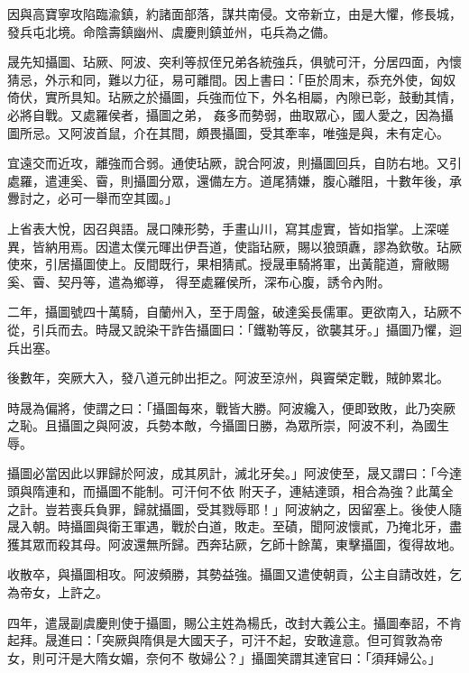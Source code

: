 \begin{pinyinscope}
 因與高寶寧攻陷臨渝鎮，約諸面部落，謀共南侵。文帝新立，由是大懼，修長城，發兵屯北境。命陰壽鎮幽州、虞慶則鎮並州，屯兵為之備。



 晟先知攝圖、玷厥、阿波、突利等叔侄兄弟各統強兵，俱號可汗，分居四面，內懷猜忌，外示和同，難以力征，易可離間。因上書曰：「臣於周末，忝充外使，匈奴倚伏，實所具知。玷厥之於攝圖，兵強而位下，外名相屬，內隙已彰，鼓動其情，必將自戰。又處羅侯者，攝圖之弟，
 姦多而勢弱，曲取眾心，國人愛之，因為攝圖所忌。又阿波首鼠，介在其間，頗畏攝圖，受其牽率，唯強是與，未有定心。



 宜遠交而近攻，離強而合弱。通使玷厥，說合阿波，則攝圖回兵，自防右地。又引處羅，遣連奚、霫，則攝圖分眾，還備左方。道尾猜嫌，腹心離阻，十數年後，承釁討之，必可一舉而空其國。」



 上省表大悅，因召與語。晟口陳形勢，手畫山川，寫其虛實，皆如指掌。上深嗟異，皆納用焉。因遣太僕元暉出伊吾道，使詣玷厥，賜以狼頭纛，謬為欽敬。玷厥使來，引居攝圖使上。反間既行，果相猜貳。授晟車騎將軍，出黃龍道，齎敝賜奚、霫、契丹等，遣為鄉導，
 得至處羅侯所，深布心腹，誘令內附。



 二年，攝圖號四十萬騎，自蘭州入，至于周盤，破達奚長儒軍。更欲南入，玷厥不從，引兵而去。時晟又說染干詐告攝圖曰：「鐵勒等反，欲襲其牙。」攝圖乃懼，迴兵出塞。



 後數年，突厥大入，發八道元帥出拒之。阿波至涼州，與竇榮定戰，賊帥累北。



 時晟為偏將，使謂之曰：「攝圖每來，戰皆大勝。阿波纔入，便即致敗，此乃突厥之恥。且攝圖之與阿波，兵勢本敵，今攝圖日勝，為眾所崇，阿波不利，為國生辱。



 攝圖必當因此以罪歸於阿波，成其夙計，滅北牙矣。」阿波使至，晟又謂曰：「今達頭與隋連和，而攝圖不能制。可汗何不依
 附天子，連結達頭，相合為強？此萬全之計。豈若喪兵負罪，歸就攝圖，受其戮辱耶！」阿波納之，因留塞上。後使人隨晟入朝。時攝圖與衛王軍遇，戰於白道，敗走。至磧，聞阿波懷貳，乃掩北牙，盡獲其眾而殺其母。阿波還無所歸。西奔玷厥，乞師十餘萬，東擊攝圖，復得故地。



 收散卒，與攝圖相攻。阿波頻勝，其勢益強。攝圖又遣使朝貢，公主自請改姓，乞為帝女，上許之。



 四年，遣晟副虞慶則使于攝圖，賜公主姓為楊氏，改封大義公主。攝圖奉詔，不肯起拜。晟進曰：「突厥與隋俱是大國天子，可汗不起，安敢違意。但可賀敦為帝女，則可汗是大隋女媚，奈何不
 敬婦公？」攝圖笑謂其達官曰：「須拜婦公。」




\end{pinyinscope}

